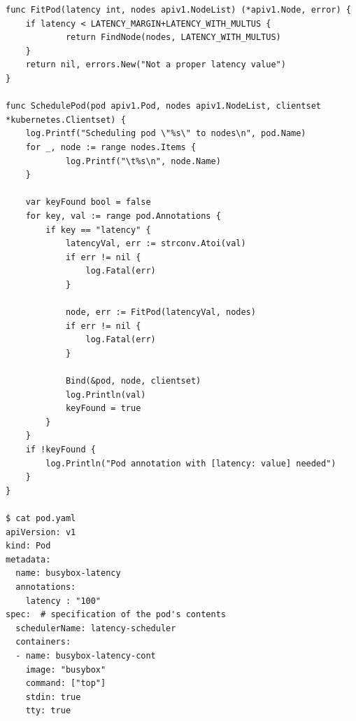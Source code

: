 \documentclass[english, 12pt, a4paper, elec, utf8, a-1b, online]{aaltothesis}
\begin{document}
\begin{lstlisting}[basicstyle={\small\ttfamily}]
func FitPod(latency int, nodes apiv1.NodeList) (*apiv1.Node, error) {
    if latency < LATENCY_MARGIN+LATENCY_WITH_MULTUS {
            return FindNode(nodes, LATENCY_WITH_MULTUS)
    }
    return nil, errors.New("Not a proper latency value")
}

func SchedulePod(pod apiv1.Pod, nodes apiv1.NodeList, clientset *kubernetes.Clientset) {
    log.Printf("Scheduling pod \"%s\" to nodes\n", pod.Name)
    for _, node := range nodes.Items {
            log.Printf("\t%s\n", node.Name)
    }

    var keyFound bool = false
    for key, val := range pod.Annotations {
        if key == "latency" {
            latencyVal, err := strconv.Atoi(val)
            if err != nil {
                log.Fatal(err)
            }

            node, err := FitPod(latencyVal, nodes)
            if err != nil {
                log.Fatal(err)
            }

            Bind(&pod, node, clientset)
            log.Println(val)
            keyFound = true
        }
    }
    if !keyFound {
        log.Println("Pod annotation with [latency: value] needed")
    }
}

$ cat pod.yaml 
apiVersion: v1
kind: Pod
metadata:
  name: busybox-latency
  annotations:
    latency : "100"
spec:  # specification of the pod's contents
  schedulerName: latency-scheduler
  containers:
  - name: busybox-latency-cont
    image: "busybox"
    command: ["top"]
    stdin: true
    tty: true

\end{lstlisting}
\end{document}
